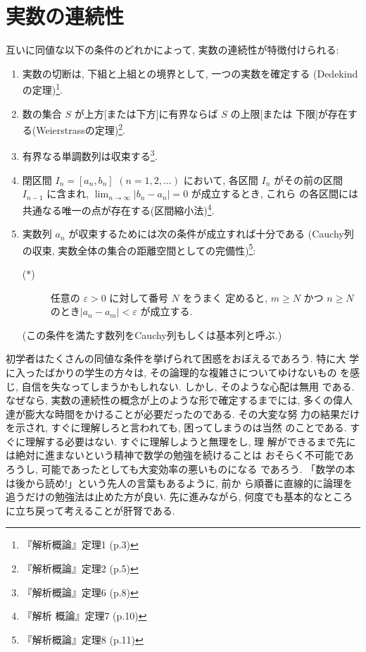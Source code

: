 \documentclass[12pt,twoside]{jarticle}
\begin{document}

\section{実数の連続性}

\begin{Theorem}[実数の連続性]
  互いに同値な以下の条件のどれかによって, 実数の連続性が特徴付けられる:
  \begin{enumerate}
  \item 実数の切断は, 下組と上組との境界として, 一つの実数を確定する
    (Dedekindの定理)\footnote{『解析概論』定理1 (p.3)}.
  \item 数の集合 $S$ が上方[または下方]に有界ならば $S$ の上限[または
    下限]が存在する(Weierstrassの定理)\footnote{『解析概論』定理2 (p.5)}.
  \item 有界なる単調数列は収束する\footnote{『解析概論』定理6 (p.8)}.
  \item 閉区間 $I_n=[a_n,b_n]$ $(n=1,2,\ldots)$ において, 各区間 $I_n$ 
    がその前の区間 $I_{n-1}$ に含まれ,
    $\displaystyle\lim_{n\to\infty}|b_n-a_n|=0$ が成立するとき, これら
    の各区間には共通なる唯一の点が存在する(区間縮小法)\footnote{『解析
      概論』定理7 (p.10)}.
  \item 実数列 $a_n$ が収束するためには次の条件が成立すれば十分である
    (Cauchy列の収束, 実数全体の集合の距離空間としての完備性)\footnote
    {『解析概論』定理8 (p.11)}:
    \begin{description}
    \item[($\ast$)] 任意の $\varepsilon > 0$ に対して番号 $N$ をうまく
      定めると, $m \ge N$ かつ $n \ge N$ のとき$|a_n - a_m| <
      \varepsilon$ が成立する.
    \end{description}
    (この条件を満たす数列をCauchy列もしくは基本列と呼ぶ.)
  \end{enumerate}
\end{Theorem}

初学者はたくさんの同値な条件を挙げられて困惑をおぼえるであろう. 特に大
学に入ったばかりの学生の方々は, その論理的な複雑さについてゆけないもの
を感じ, 自信を失なってしまうかもしれない. しかし, そのような心配は無用
である. なぜなら, 実数の連続性の概念が上のような形で確定するまでには, 
多くの偉人達が膨大な時間をかけることが必要だったのである. その大変な努
力の結果だけを示され, すぐに理解しろと言われても, 困ってしまうのは当然
のことである. すぐに理解する必要はない. すぐに理解しようと無理をし, 理
解ができるまで先には絶対に進まないという精神で数学の勉強を続けることは
おそらく不可能であろうし, 可能であったとしても大変効率の悪いものになる
であろう. 「数学の本は後から読め!」という先人の言葉もあるように, 前か
ら順番に直線的に論理を追うだけの勉強法は止めた方が良い. 先に進みながら,
何度でも基本的なところに立ち戻って考えることが肝腎である. 
\end{document}
